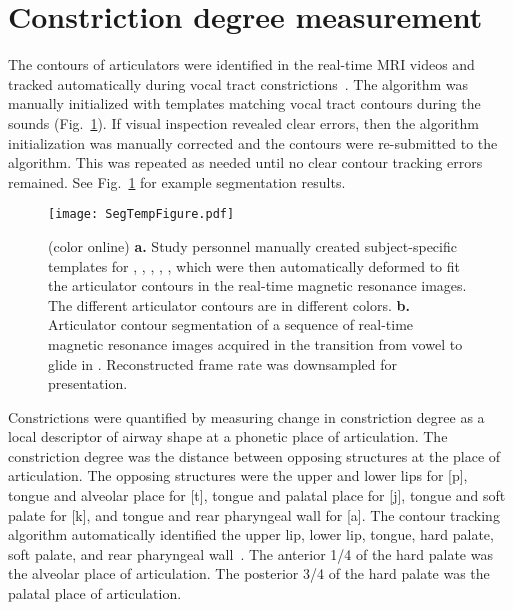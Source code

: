 \documentclass[preprint]{JASAnew}
\begin{document}
\section{Constriction degree measurement}
\label{sec:cd}

The contours of articulators were identified in the real-time MRI videos and tracked automatically during vocal tract constrictions~\citep{bresch2009region}. The algorithm was manually initialized with templates matching vocal tract contours during the sounds \textipa{[a], [i], [p], [t], [k]} (Fig.~\ref{fig:segtemp}). 
%
If visual inspection revealed clear errors, then the algorithm initialization was manually corrected and the contours were re-submitted to the algorithm. This was repeated as needed until no clear contour tracking errors remained. 
%
See Fig.~\ref{fig:segtemp} for example segmentation results.

\begin{figure}

\texttt{[image: SegTempFigure.pdf]}

\caption{(color online) {\bf a.} Study personnel manually created subject-specific templates for \textipa{[a]}, \textipa{[i]}, \textipa{[p]}, \textipa{[t]}, \textipa{[k]}, which were then automatically deformed to fit the articulator contours in the real-time magnetic resonance images. The different articulator contours are in different colors.
{\bf b.} Articulator contour segmentation of a sequence of real-time magnetic resonance images acquired in the transition from vowel \textipa{[a]} to glide \textipa{[j]} in \textipa{[aja]}. Reconstructed frame rate was downsampled for presentation.}
\label{fig:segtemp}
\end{figure}



Constrictions were quantified by measuring change in constriction degree as a local descriptor of airway shape at a phonetic place of articulation. 
%
The constriction degree was the distance between opposing structures at the place of articulation. 
%
The opposing structures were the upper and lower lips for [p], tongue and alveolar place for [t], tongue and palatal place for [j], tongue and soft palate for [k], and tongue and rear pharyngeal wall for [a]. 
%
The contour tracking algorithm automatically identified the upper lip, lower lip, tongue, hard palate, soft palate, and rear pharyngeal wall~\citep{bresch2009region}.  
%
The anterior \num{1/4} of the hard palate was the alveolar place of articulation. 
%
The posterior \num{3/4} of the hard palate was the palatal place of articulation.
\end{document}
